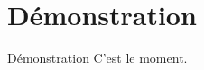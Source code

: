 \section{Démonstration}

\begin{frame}{Démonstration}
\Large \centering C'est le moment.
\end{frame}